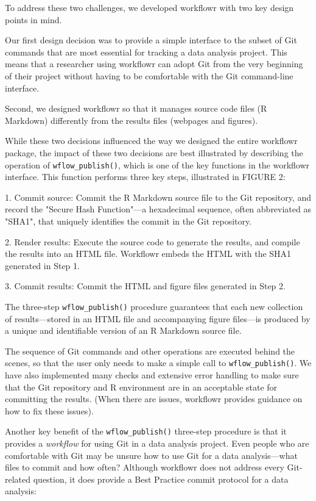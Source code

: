 \documentclass[9pt,a4paper]{extarticle}
\begin{document}
To address these two challenges, we developed workflowr with two key
design points in mind.

Our first design decision was to provide a simple interface to the
subset of Git commands that are most essential for tracking a data
analysis project. This means that a researcher using workflowr can adopt
Git from the very beginning of their project without having to be
comfortable with the Git command-line interface.

Second, we designed workflowr so that it manages source code files (R
Markdown) differently from the results files (webpages and figures).

While these two decisions influenced the way we designed the entire
workflowr package, the impact of these two decisions are best
illustrated by describing the operation of \verb|wflow_publish()|, which is one
of the key functions in the workflowr interface. This function performs
three key steps, illustrated in FIGURE 2:

1. Commit source: Commit the R Markdown source file to the Git
repository, and record the "Secure Hash Function"—a hexadecimal
sequence, often abbreviated as "SHA1", that uniquely identifies the
commit in the Git repository.

2. Render results: Execute the source code to generate the results, and
compile the results into an HTML file. Workflowr embeds the HTML with
the SHA1 generated in Step 1.

3. Commit results: Commit the HTML and figure files generated in Step 2.

The three-step \verb|wflow_publish()| procedure guarantees that each new
collection of results—stored in an HTML file and accompanying figure
files—is produced by a unique and identifiable version of an R Markdown
source file.

The sequence of Git commands and other operations are executed behind
the scenes, so that the user only needs to make a simple call to
\verb|wflow_publish()|. We have also implemented many checks and extensive
error handling to make sure that the Git repository and R environment
are in an acceptable state for committing the results. (When there are
issues, workflowr provides guidance on how to fix these issues).

Another key benefit of the \verb|wflow_publish()| three-step procedure is that
it provides a \textit{workflow} for using Git in a data analysis
project. Even people who are comfortable with Git may be unsure how to
use Git for a data analysis—what files to commit and how often? Although
workflowr does not address every Git-related question, it does provide a
Best Practice commit protocol for a data analysis:
\end{document}
